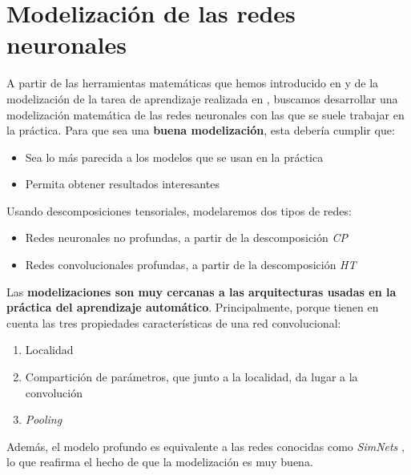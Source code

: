 \chapter{Modelización de las redes neuronales} \label{ch:modelizacion}

A partir de las herramientas matemáticas que hemos introducido en  y de la modelización de la tarea de aprendizaje realizada en , buscamos desarrollar una modelización matemática de las redes neuronales con las que se suele trabajar en la práctica. Para que sea una \textbf{buena modelización}, esta debería cumplir que:

\begin{itemize}
    \item Sea lo más parecida a los modelos que se usan en la práctica
    \item Permita obtener resultados interesantes
\end{itemize}

Usando descomposiciones tensoriales, modelaremos dos tipos de redes:

\begin{itemize}
    \item Redes neuronales no profundas, a partir de la descomposición \textit{CP}
    \item Redes convolucionales profundas, a partir de la descomposición \textit{HT}
\end{itemize}

Las \textbf{modelizaciones son muy cercanas a las arquitecturas usadas en la práctica del aprendizaje automático}. Principalmente, porque tienen en cuenta las tres propiedades características de una red convolucional:

\begin{enumerate}
    \item Localidad
    \item Compartición de parámetros, que junto a la localidad, da lugar a la convolución
    \item \textit{Pooling}
\end{enumerate}

Además, el modelo profundo es equivalente a las redes conocidas como \textit{SimNets} \cite{matematicas:principal}, lo que reafirma el hecho de que la modelización es muy buena.

